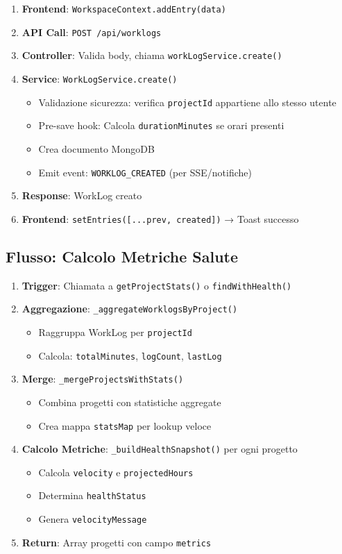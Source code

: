 \documentclass[11pt,a4paper]{article}
\begin{document}
\begin{enumerate}
    \item \textbf{Frontend}: \texttt{WorkspaceContext.addEntry(data)}
    \item \textbf{API Call}: \texttt{POST /api/worklogs}
    \item \textbf{Controller}: Valida body, chiama \texttt{workLogService.create()}
    \item \textbf{Service}: \texttt{WorkLogService.create()}
    \begin{itemize}
        \item Validazione sicurezza: verifica \texttt{projectId} appartiene allo stesso utente
        \item Pre-save hook: Calcola \texttt{durationMinutes} se orari presenti
        \item Crea documento MongoDB
        \item Emit event: \texttt{WORKLOG\_CREATED} (per SSE/notifiche)
    \end{itemize}
    \item \textbf{Response}: WorkLog creato
    \item \textbf{Frontend}: \texttt{setEntries([...prev, created])} → Toast successo
\end{enumerate}

\subsection{Flusso: Calcolo Metriche Salute}

\begin{enumerate}
    \item \textbf{Trigger}: Chiamata a \texttt{getProjectStats()} o \texttt{findWithHealth()}
    \item \textbf{Aggregazione}: \texttt{\_aggregateWorklogsByProject()}
    \begin{itemize}
        \item Raggruppa WorkLog per \texttt{projectId}
        \item Calcola: \texttt{totalMinutes}, \texttt{logCount}, \texttt{lastLog}
    \end{itemize}
    \item \textbf{Merge}: \texttt{\_mergeProjectsWithStats()}
    \begin{itemize}
        \item Combina progetti con statistiche aggregate
        \item Crea mappa \texttt{statsMap} per lookup veloce
    \end{itemize}
    \item \textbf{Calcolo Metriche}: \texttt{\_buildHealthSnapshot()} per ogni progetto
    \begin{itemize}
        \item Calcola \texttt{velocity} e \texttt{projectedHours}
        \item Determina \texttt{healthStatus}
        \item Genera \texttt{velocityMessage}
    \end{itemize}
    \item \textbf{Return}: Array progetti con campo \texttt{metrics}
\end{enumerate}
\end{document}
